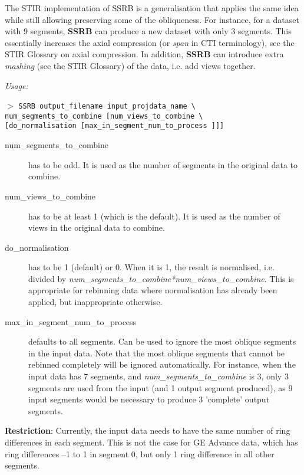 \documentclass{article}
\newcommand{\cmdline}[1]{\par \noindent $>$ \texttt{#1}\par}
\begin{document}
The STIR implementation of SSRB is a generalisation that applies 
the same idea while still allowing preserving some of the obliqueness. 
For instance, for a dataset with 9 segments, \textbf{SSRB} can produce 
a new dataset with only 3 segments. This essentially increases 
the axial compression (or \textit{span} in CTI terminology), see the 
STIR Glossary on axial compression. In addition, \textbf{SSRB} can 
introduce extra \textit{mashing} (see the STIR Glossary) of the data, 
i.e. add views together.


\textit{Usage:}
\cmdline{SSRB output\_filename input\_projdata\_name {\textbackslash} \\
num\_segments\_to\_combine [num\_views\_to\_combine {\textbackslash}\\
{[}do\_normalisation [max\_in\_segment\_num\_to\_process ]]]}

\begin{description}
\item[num\_segments\_to\_combine] has to be odd. It is used as the 
number of segments in the original data to combine.
\item[num\_views\_to\_combine] has to be at least 1 (which 
is the default). It is used as the number of views in the original 
data to combine.
\item[do\_normalisation] has to be 1 (default) or 0. When it is 1, 
the result is normalised, i.e. divided by \textit{num\_segments\_to\_combine*num\_views\_to\_combine}. 
This is appropriate for rebinning data where normalisation has 
already been applied, but inappropriate otherwise.

\item[max\_in\_segment\_num\_to\_process] defaults to all segments. 
Can be used to ignore the most oblique segments in the input 
data. Note that the most oblique segments that cannot be rebinned 
completely will be ignored automatically. For instance, when 
the input data has 7 segments, and \textit{num\_segments\_to\_combine} is 
3, only 3 segments are used from the input (and 1 output segment 
produced), as 9 input segments would be necessary to produce 
3 'complete' output segments.
\end{description}

\textbf{Restriction}: Currently, the input data needs to have the 
same number of ring differences in each segment. This is not 
the case for GE Advance data, which has ring differences --1 to 
1 in segment 0, but only 1 ring difference in all other segments.
\end{document}
